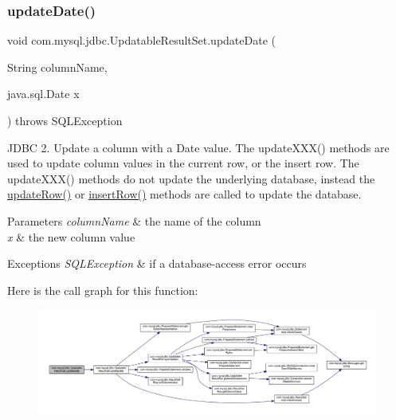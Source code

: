 \subsubsection{\texorpdfstring{update\+Date()}{updateDate()}\hspace{0.1cm}{\footnotesize\ttfamily [2/2]}}
{\footnotesize\ttfamily void com.\+mysql.\+jdbc.\+Updatable\+Result\+Set.\+update\+Date (\begin{DoxyParamCaption}\item[{String}]{column\+Name,  }\item[{java.\+sql.\+Date}]{x }\end{DoxyParamCaption}) throws S\+Q\+L\+Exception}

J\+D\+BC 2. Update a column with a Date value. The update\+X\+X\+X() methods are used to update column values in the current row, or the insert row. The update\+X\+X\+X() methods do not update the underlying database, instead the \mbox{\hyperlink{classcom_1_1mysql_1_1jdbc_1_1_updatable_result_set_a919969ba4b3c7cbc7b18605e9f31a746}{update\+Row()}} or \mbox{\hyperlink{classcom_1_1mysql_1_1jdbc_1_1_updatable_result_set_aef041f8d9d0778083716fc26652648fa}{insert\+Row()}} methods are called to update the database.


\begin{DoxyParams}{Parameters}
{\em column\+Name} & the name of the column \\
\hline
{\em x} & the new column value\\
\hline
\end{DoxyParams}

\begin{DoxyExceptions}{Exceptions}
{\em S\+Q\+L\+Exception} & if a database-\/access error occurs \\
\hline
\end{DoxyExceptions}
Here is the call graph for this function\+:
\nopagebreak
\begin{figure}[H]
\begin{center}
\leavevmode
\includegraphics[width=350pt]{classcom_1_1mysql_1_1jdbc_1_1_updatable_result_set_a1616cc440d8f6ef722aad7914a381747_cgraph}
\end{center}
\end{figure}
\mbox{\label{classcom_1_1mysql_1_1jdbc_1_1_updatable_result_set_acaefa9679a9a4f8b588c76c960756f87}} 

